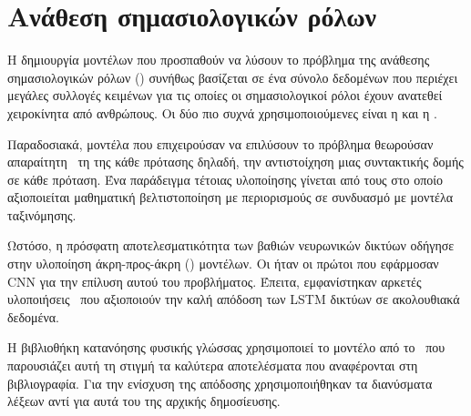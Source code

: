 \section{Ανάθεση σημασιολογικών ρόλων}
Η δημιουργία μοντέλων που προσπαθούν να λύσουν το πρόβλημα της ανάθεσης σημασιολογικών ρόλων (\SRLR{}) συνήθως βασίζεται σε ένα σύνολο δεδομένων που περιέχει μεγάλες συλλογές κειμένων για τις οποίες οι σημασιολογικοί ρόλοι έχουν ανατεθεί χειροκίνητα από ανθρώπους.
Οι δύο πιο συχνά χρησιμοποιούμενες είναι η  και η .

Παραδοσιακά, μοντέλα που επιχειρούσαν να επιλύσουν το πρόβλημα θεωρούσαν απαραίτητη~\cite{carreras2005introduction,punyakanok2008importance} τη  της κάθε πρότασης δηλαδή,
την αντιστοίχηση μιας συντακτικής δομής σε κάθε πρόταση.
Ένα παράδειγμα τέτοιας υλοποίησης γίνεται από τους \citet{koomen2005generalized} στο οποίο αξιοποιείται μαθηματική βελτιστοποίηση με περιορισμούς σε συνδυασμό με μοντέλα ταξινόμησης.

Ωστόσο, η πρόσφατη αποτελεσματικότητα των βαθιών νευρωνικών δικτύων οδήγησε στην υλοποίηση άκρη-προς-άκρη () μοντέλων.
Οι \citet{collobert2011natural} ήταν οι πρώτοι που εφάρμοσαν CNN για την επίλυση αυτού του προβλήματος.
Έπειτα, εμφανίστηκαν αρκετές υλοποιήσεις~\cite{zhou2015end,marcheggiani2017simple,he2017deep} που αξιοποιούν την καλή απόδοση των LSTM δικτύων σε ακολουθιακά δεδομένα.

Η βιβλιοθήκη κατανόησης φυσικής γλώσσας  χρησιμοποιεί το μοντέλο από το~\cite{he2017deep} που παρουσιάζει αυτή τη στιγμή τα καλύτερα αποτελέσματα που αναφέρονται στη βιβλιογραφία.
Για την ενίσχυση της απόδοσης χρησιμοποιήθηκαν τα διανύσματα λέξεων  αντί για αυτά του  της αρχικής δημοσίευσης.

